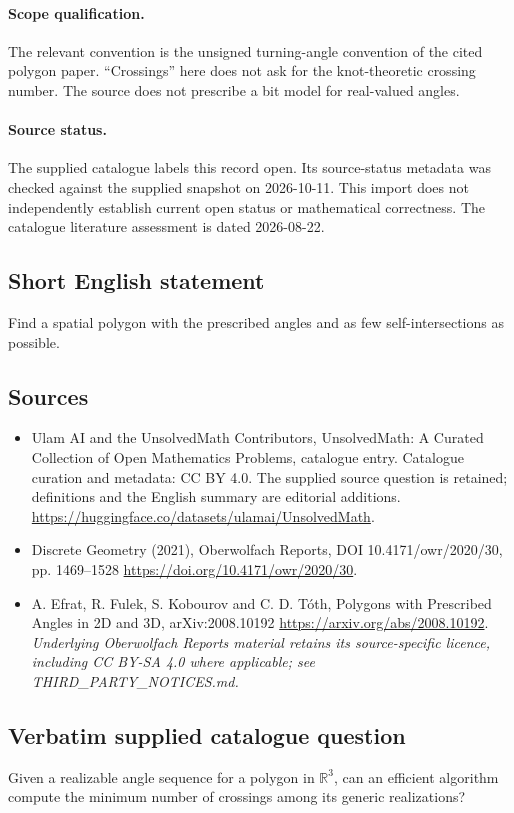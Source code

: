 \documentclass[11pt]{article}
\begin{document}
\paragraph{Scope qualification.}
The relevant convention is the unsigned turning-angle convention of the cited polygon paper. ``Crossings'' here does not ask for the knot-theoretic crossing number. The source does not prescribe a bit model for real-valued angles.
\paragraph{Source status.}
The supplied catalogue labels this record open. Its source-status metadata was checked against the supplied snapshot on 2026-10-11. This import does not independently establish current open status or mathematical correctness. The catalogue literature assessment is dated 2026-08-22.
\subsection{Short English statement}
Find a spatial polygon with the prescribed angles and as few self-intersections as possible.
\subsection{Sources}
\begin{itemize}
\item[S1] Ulam AI and the UnsolvedMath Contributors, UnsolvedMath: A Curated Collection of Open Mathematics Problems, catalogue entry. Catalogue curation and metadata: CC BY 4.0. The supplied source question is retained; definitions and the English summary are editorial additions.
\url{https://huggingface.co/datasets/ulamai/UnsolvedMath}.
\item[S2] Discrete Geometry (2021), Oberwolfach Reports, DOI 10.4171/owr/2020/30, pp. 1469--1528
\url{https://doi.org/10.4171/owr/2020/30}.
\item[S3] A. Efrat, R. Fulek, S. Kobourov and C. D. Tóth, Polygons with Prescribed Angles in 2D and 3D, arXiv:2008.10192
\url{https://arxiv.org/abs/2008.10192}.
\textit{Underlying Oberwolfach Reports material retains its source-specific licence, including CC BY-SA 4.0 where applicable; see THIRD\_PARTY\_NOTICES.md.}
\end{itemize}
\subsection{Verbatim supplied catalogue question}
Given a realizable angle sequence for a polygon in $\mathbb{R}^3$, can an efficient algorithm compute the minimum number of crossings among its generic realizations?
\end{document}
